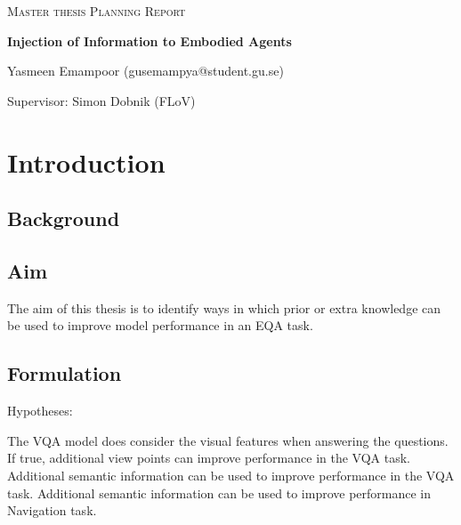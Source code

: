 \documentclass{article}
\begin{document}
\begin{titlepage}
  

\centering
  
  
{\scshape\LARGE Master thesis Planning Report\\}
  
\vspace{0.5cm}
  
{\huge\bfseries Injection of Information to Embodied Agents\\}

  
\vspace{2cm}
  
{\Large Yasmeen Emampoor (gusemampya@student.gu.se)\\}
  
\vspace{1.0cm}
  
{\large Supervisor: Simon Dobnik (FLoV)\\}
  
\vspace{1.5cm}

\end{titlepage}
  
\section{Introduction}
\subsection{Background}

\subsection{Aim}
The aim of this thesis is to identify ways in which prior or extra knowledge can be used to improve model performance in an EQA task. 

\subsection{Formulation}

Hypotheses: 
\begin{outline}
	\1 The VQA model does consider the visual features when answering the questions.
		\2 If true, additional view points can improve performance in the VQA task. 
	\1 Additional semantic information can be used to improve performance in the VQA task. 
	\1 Additional semantic information can be used to improve performance in Navigation task. 
\end{outline}
 
\end{document}
